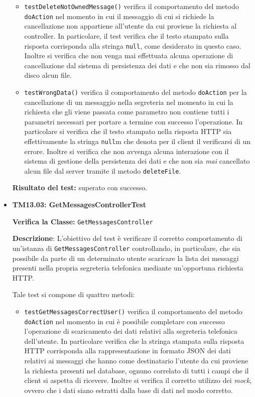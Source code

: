 \begin{itemize}
\begin{itemize}
\item \texttt{testDeleteNotOwnedMessage()} verifica il comportamento del metodo \texttt{doAction} nel momento in cui il messaggio di cui si richiede la cancellazione non appartiene all'utente da cui proviene la richiesta al controller. In particolare, il test verifica che il testo stampato sulla risposta corrisponda alla stringa \texttt{null}, come desiderato in questo caso. Inoltre si verifica che non venga mai effettuata alcuna operazione di cancellazione dal sistema di persistenza dei dati e che non sia rimosso dal disco alcun file.

\item \texttt{testWrongData()} verifica il comportamento del metodo \texttt{doAction} per la cancellazione di un messaggio nella segreteria nel momento in cui la richiesta che gli viene passata come parametro non contiene tutti i parametri necessari per portare a termine con successo l'operazione. In particolare si verifica che il testo stampato nella risposta HTTP sia effettivamente la stringa \texttt{null}m che denota per il client il verificarsi di un errore. Inoltre si verifica che non avvenga alcuna interazione con il sistema di gestione della persistenza dei dati e che non sia \textit{mai} cancellato alcun file dal server tramite il metodo \texttt{deleteFile}.

\end{itemize}
\textbf{Risultato del test:} superato con successo.

\item[\passed] \textbf{TM13.03: GetMessagesControllerTest}

\textbf{Verifica la Classe:} \texttt{GetMessagesController}

\textbf{Descrizione}: L'obiettivo del test è verificare il corretto comportamento di un'istanza di \texttt{GetMessagesController} controllando, in particolare, che sia possibile da parte di un determinato utente scaricare la lista dei messaggi presenti nella propria segreteria telefonica mediante un'opportuna richiesta HTTP\@.

Tale test si compone di quattro metodi:
\begin{itemize}
\item \texttt{testGetMessagesCorrectUser()} verifica il comportamento del metodo \texttt{doAction} nel momento in cui è possibile completare con successo l'operazione di scaricamento dei dati relativi alla segreteria telefonica dell'utente. In particolare verifica che la stringa stampata sulla risposta HTTP corrisponda alla rappresentazione in formato JSON dei dati relativi ai messaggi che hanno come destinatario l'utente da cui proviene la richiesta presenti nel database, ognuno correlato di tutti i campi che il client si aspetta di ricevere. Inoltre si verifica il corretto utilizzo dei \textit{mock}, ovvero che i dati siano estratti dalla base di dati nel modo corretto.


\end{itemize}
\end{itemize}

